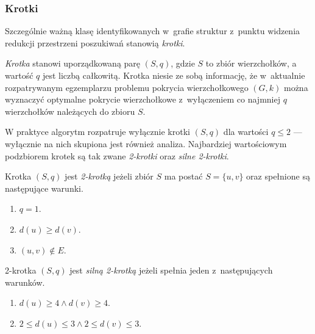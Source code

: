 \subsubsection{\textbf{Krotki}}
\label{sss_ckx_tuples}
\par{
  Szczególnie ważną klasę identyfikowanych w~grafie struktur z~punktu widzenia redukcji przestrzeni poszukiwań stanowią \emph{krotki}.
  \begin{definition}
    \emph{Krotka} stanowi uporządkowaną parę $(S, q)$, gdzie $S$ to zbiór wierzchołków, a wartość $q$ jest liczbą całkowitą.
    Krotka niesie ze sobą informację, że w~aktualnie rozpatrywanym egzemplarzu problemu pokrycia wierzchołkowego $(G, k)$ można wyznaczyć optymalne pokrycie wierzchołkowe z~wyłączeniem co najmniej $q$ wierzchołków należących do zbioru $S$.
  \end{definition}
  W praktyce algorytm rozpatruje wyłącznie krotki $(S, q)$ dla wartości $q \leq 2$ --- wyłącznie na nich skupiona jest również analiza.
  Najbardziej wartościowym podzbiorem krotek są tak zwane \emph{2-krotki} oraz \emph{silne 2-krotki}.
  \begin{definition}
    Krotka $(S, q)$ jest \emph{2-krotką} jeżeli zbiór $S$ ma postać $S=\{u, v\}$ oraz spełnione są następujące warunki.
    \begin{enumerate}
      \item $q=1$.
      \item $d(u) \geq d(v)$.
      \item $(u, v) \notin E$.
    \end{enumerate}
  \end{definition}
  \begin{definition}
    2-krotka $(S, q)$ jest \emph{silną 2-krotką} jeżeli spełnia jeden z~następujących warunków.
    \begin{enumerate}
      \item $d(u) \geq 4 \land d(v) \geq 4$.
      \item $2 \leq d(u) \leq 3 \land 2 \leq d(v) \leq 3$.
    \end{enumerate}
  \end{definition}
}
